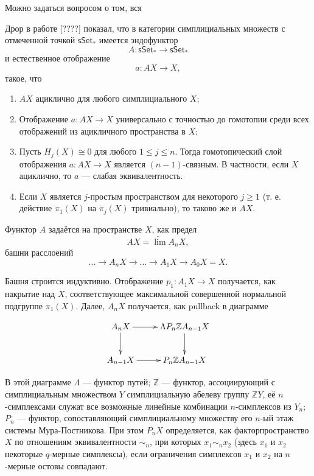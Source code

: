 \documentclass[14pt, dvipsnames]{extarticle}
\theoremstyle{definition}
\theoremstyle{remark}
\begin{document}
Можно задаться вопросом о том, вся




Дрор в работе [????] показал, что в категории симплициальных множеств с отмеченной точкой $\mathsf{sSet}_\ast$ имеется эндофунктор $$A: \mathsf{sSet}_\ast \to \mathsf{sSet}_\ast$$ и естественное отображение $$a: AX\to X,$$ такое, что 

\begin{enumerate} 

\item $AX$ ациклично для любого симплициального $X$;

\item Отображение $a: AX\to X$ универсально с точностью до гомотопии среди всех отображений из ацикличного пространства в $X$;

\item Пусть $H_j(X)\cong 0$ для любого $1\leqslant j \leqslant n$. Тогда гомотопический слой отображения $a: AX\to X$ является $(n-1)$-связным. В частности, если $X$ ациклично, то $a$ --- слабая эквивалентность. \label{DrorProperty}

\item Если $X$ является $j$-простым пространством для некоторого $j\geqslant 1$ (т. е. действие $\pi_1(X)$ на $\pi_j(X)$ тривиально), то таково же и $AX$. 

\end{enumerate}

Функтор $A$ задаётся на пространстве $X$, как предел $$AX = \underleftarrow{\lim} A_n X,$$ башни расслоений $$...\to A_n X\to ...\to A_1X \to A_0X = X.$$

Башня строится индуктивно. Отображение $p_1 : A_1X\to X$ получается, как накрытие над $X$, соответствующее максимальной совершенной нормальной подгруппе $\pi_1(X)$. Далее, $A_nX$ получается, как pullback в диаграмме  

\begin{equation}\label{Dror}
\xymatrix{
    A_nX \ar[r] \ar[d] & \Lambda P_n \mathbb{Z} A_{n-1} X \ar[d] \\
    A_{n-1}X \ar[r]       & P_n\mathbb{Z}A_{n-1}X }
\end{equation}
    
 В этой диаграмме $\Lambda$ --- функтор путей; $\mathbb{Z}$ --- функтор, ассоциирующий с симплициальным множеством $Y$ симплициальную абелеву группу $\mathbb{Z}Y$, её $n$-симплексами служат все возможные линейные комбинации $n$-симплексов из $Y_n$; $P_n$ --- функтор, сопоставляющий симплициальному множеству его $n$-ый этаж системы Мура-Постникова. При этом $P_nX$ определяется, как факторпространство $X$ по отношениям эквивалентности $\sim_n$, при которых $x_1\sim_n x_2$ (здесь $x_1$ и $x_2$ некоторые $q$-мерные симплексы), если ограничения симплексов $x_1$ и $x_2$ на $n$-мерные остовы совпадают. 
\end{document}
